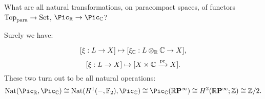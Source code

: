 What are all natural transformations, on paracompact spaces, of functors ${\mathrm{Top}}_\text{para}\to{\mathrm{Set}}$, $\Pic_\R\to\Pic_\CC$?

Surely we have:

\[[\xi:L\to X]\mapsto[\xi_{\mathbb{C}}:L\otimes_{\mathbb R}\mathbb{C}\to X],\]
\[[\xi:L\to X]\mapsto[X\times\mathbb{C}\xrightarrow{\operatorname{pr}} X].\]
These two turn out to be all natural operations:
\[\Nat(\Pic_\R,\Pic_\CC)\cong\Nat(H^1(-,\FF_2),\Pic_\CC)\cong\Pic_\CC(\rp{\infty})\cong H^2(\rp{\infty};\Z)\cong\Z/2.\]
